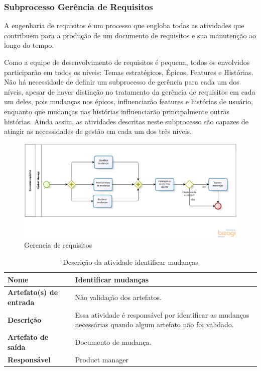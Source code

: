     \subsubsection{Subprocesso Gerência de Requisitos}


    A engenharia de requisitos é um processo que engloba todas as atividades que contribuem para a produção de um documento de requisitos e sua manutenção ao longo do tempo.

    Como a equipe de desenvolvimento de requisitos é pequena, todos os envolvidos participarão em todos os níveis: Temas estratégicos, Épicos, Features e Histórias. Não há necessidade de definir um subprocesso de gerência para cada um dos níveis, apesar de haver distinção no tratamento da gerência de requisitos em cada um deles, pois mudanças nos épicos, influenciarão features e histórias de usuário, enquanto que mudanças nas histórias influenciarão principalmente outras histórias. Ainda assim, as atividades descritas neste subprocesso são capazes de atingir as necessidades de gestão em cada um dos três níveis.

    \begin{figure}[H]
        \centering
        \caption{Gerencia de requisitos}
        \label{processoGerencia}
        \includegraphics[keepaspectratio=true,scale=0.5]{figuras/processoGerencia.eps}
    \end{figure}

    \begin{table}[H]
        \centering
        \label{descricaoAtividades24}
        \caption{Descrição da atividade identificar mudanças}
            \begin{tabular}{|l|p{10cm}|}
            \hline
            \textbf{Nome} & Identificar mudanças \\
            \hline
            \textbf{Artefato(s) de entrada} & Não validação dos artefatos. \\
            \hline
            \textbf{Descrição} & Essa atividade é responsável por identificar as mudanças necessárias quando algum artefato não foi validado. \\
            \hline
            \textbf{Artefato de saída} & Documento de mudança. \\
            \hline
            \textbf{Responsável} & Product manager \\
            \hline
        \end{tabular}
    \end{table}

